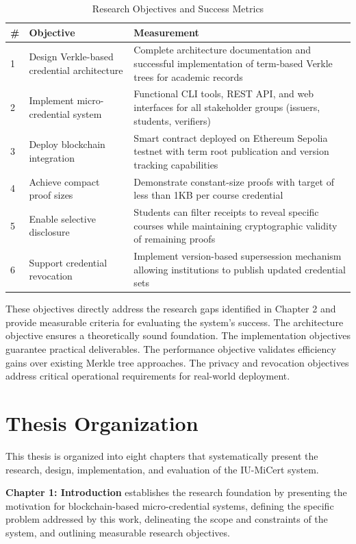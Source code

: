 \begin{table}[H]
\centering
\caption{Research Objectives and Success Metrics}
\label{tab:objectives}
\begin{tabular}{|p{0.5cm}|p{6cm}|p{7cm}|}
\hline
\textbf{\#} & \textbf{Objective} & \textbf{Measurement} \\
\hline
1 & Design Verkle-based credential architecture & Complete architecture documentation and successful implementation of term-based Verkle trees for academic records \\
\hline
2 & Implement micro-credential system & Functional CLI tools, REST API, and web interfaces for all stakeholder groups (issuers, students, verifiers) \\
\hline
3 & Deploy blockchain integration & Smart contract deployed on Ethereum Sepolia testnet with term root publication and version tracking capabilities \\
\hline
4 & Achieve compact proof sizes & Demonstrate constant-size proofs with target of less than 1KB per course credential \\
\hline
5 & Enable selective disclosure & Students can filter receipts to reveal specific courses while maintaining cryptographic validity of remaining proofs \\
\hline
6 & Support credential revocation & Implement version-based supersession mechanism allowing institutions to publish updated credential sets \\
\hline
\end{tabular}
\end{table}

These objectives directly address the research gaps identified in Chapter 2 and provide measurable criteria for evaluating the system's success. The architecture objective ensures a theoretically sound foundation. The implementation objectives guarantee practical deliverables. The performance objective validates efficiency gains over existing Merkle tree approaches. The privacy and revocation objectives address critical operational requirements for real-world deployment.

\section{Thesis Organization}
This thesis is organized into eight chapters that systematically present the research, design, implementation, and evaluation of the IU-MiCert system.

\textbf{Chapter 1: Introduction} establishes the research foundation by presenting the motivation for blockchain-based micro-credential systems, defining the specific problem addressed by this work, delineating the scope and constraints of the system, and outlining measurable research objectives.

